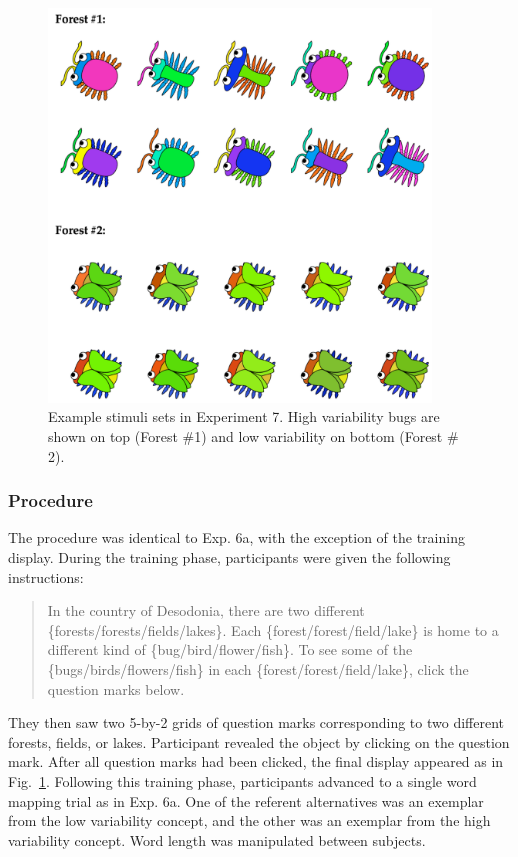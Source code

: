   \begin{figure}[t!]
 \begin{center}
  \includegraphics[width=4in]{figs/var_screen_shot.png}
  \caption{\label{fig:var_screen_shot} Example stimuli sets in Experiment 7. High variability bugs are shown on top (Forest \#1) and low variability on bottom (Forest \# 2).}
 \end{center}
\end{figure}

\subsubsection{Procedure}
The procedure was identical to Exp. 6a, with the exception of the training display. During the training phase, participants were given the following instructions:

\begin{quote}
In the country of Desodonia, there are two different \{forests/forests/fields/lakes\}. Each \{forest/forest/field/lake\}  is home to a different kind of \{bug/bird/flower/fish\}. To see some of the \{bugs/birds/flowers/fish\} in each \{forest/forest/field/lake\}, click the question marks below.
\end{quote}

They then saw two 5-by-2 grids of question marks corresponding to two different forests, fields, or lakes. Participant revealed the object by clicking on the question mark. After all question marks had been clicked, the final display appeared as in Fig.\ \ref{fig:var_screen_shot}. Following this training phase, participants advanced to a single word mapping trial as in Exp. 6a. One of the referent alternatives was an exemplar from the low variability concept, and the other was an exemplar from the high variability concept. Word length was manipulated between subjects.

